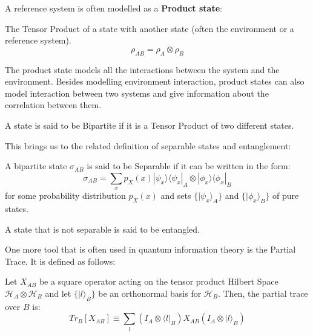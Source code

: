 A reference system is often modelled as a \textbf{Product state}:
\begin{definition}
    The Tensor Product of a state with another state (often the environment or a reference system).
    \begin{equation*}
        \rho_{AB} = \rho_A \otimes \rho_B
    \end{equation*}
\end{definition}
The product state models all the interactions between the system and the environment. Besides modelling
environment interaction, product states can also model interaction between two systems and give
information about the correlation between them.
\begin{definition}
    A state is said to be Bipartite if it is a Tensor Product of two different states.
\end{definition}

This brings us to the related definition of separable states and entanglement:
\begin{definition}
    A bipartite state $\sigma_{AB}$ is said to be Separable if it can be written in the form:
    \begin{equation*}
        \sigma_{AB} = \displaystyle\sum_{x} p_X(x)|\psi_x\rangle\langle\psi_x|_A \otimes |\phi_x\rangle\langle\phi_x|_B
    \end{equation*}
    for some probability distribution $p_X(x)$ and sets $\{| \psi_x \rangle_A\}$ and $\{| \phi_x \rangle_B\}$ of pure states.
\end{definition}

\begin{definition}[Entanglement]
    A state that is not separable is said to be entangled.
\end{definition}

One more tool that is often used in quantum information theory is the Partial Trace. It is defined as follows:

\begin{definition}
    Let $X_{AB}$ be a square operator acting on the tensor product Hilbert Space $\mathcal{H}_A\otimes \mathcal{H}_B$
    and let $\{| l \rangle_B\}$ be an orthonormal basis for $\mathcal{H}_B$. Then, the partial trace over $B$ is:
    \begin{equation*}
        Tr_B[X_{AB}] \equiv \displaystyle\sum_{l} (I_A \otimes \langle l |_B) X_{AB} (I_A \otimes | l \rangle_B)
    \end{equation*}
\end{definition}

